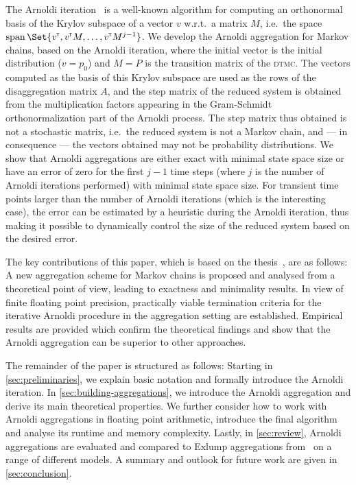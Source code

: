 \documentclass[runningheads]{llncs}
\newcommand*{\abbrev}[1]{\textsc{#1}}
\newcommand*{\transp}{^{\mkern-1.5mu{\scriptscriptstyle\mathsf{T}}}}
\DeclareMathOperator{\spn}{span}
\begin{document}
The Arnoldi iteration~\cite{arnoldi1951iteration} is a well-known algorithm for computing an orthonormal basis of the Krylov subspace of a vector $v$ w.r.t.\ a matrix $M$, i.e.\ the space $\spn\Set{v\transp, v\transp M, \dots, v\transp M^{j - 1}}$.
We develop the Arnoldi aggregation for Markov chains, based on the Arnoldi iteration, where the initial vector is the initial distribution ($v=p_0$) and $M=P$ is the transition matrix of the \abbrev{dtmc}.
The vectors computed as the basis of this Krylov subspace are used as the rows of the disaggregation matrix $A$, and the step matrix of the reduced system is obtained from the multiplication factors appearing in the Gram-Schmidt orthonormalization part of the Arnoldi process.
The step matrix thus obtained is not a stochastic matrix, i.e.\ the reduced system is not a Markov chain, and --- in consequence --- the vectors obtained may not be probability distributions.
We show that Arnoldi aggregations are either exact with minimal state space size or have an error of zero for the first $j-1$ time steps (where $j$ is the number of Arnoldi iterations performed)  with minimal state space size.
For transient time points larger than the number of Arnoldi iterations (which is the interesting case), the error can be estimated by a heuristic during the Arnoldi iteration, thus making it possible to dynamically control the size of the reduced system based on the desired error.

The key contributions of this paper, which is based on the thesis~\cite{sonnentag2025thesis}, are as follows:
A new aggregation scheme for Markov chains is proposed and analysed from a theoretical point of view, leading to exactness and minimality results.
In view of finite floating point precision, practically viable termination criteria for the iterative Arnoldi procedure in the aggregation setting are established.
Empirical results are provided which confirm the theoretical findings and show that the Arnoldi aggregation can be superior to other approaches.

The remainder of the paper is structured as follows:
Starting in \cref{sec:preliminaries}, we explain basic notation and formally introduce the Arnoldi iteration.
In \cref{sec:building-aggregations}, we introduce the Arnoldi aggregation and derive its main theoretical properties.
We further consider how to work with Arnoldi aggregations in floating point arithmetic, introduce the final algorithm and analyse its runtime and memory complexity.
Lastly, in \cref{sec:review}, Arnoldi aggregations are evaluated and compared to Exlump aggregations from~\cite[Algorithm~3]{michel2025formalbounds} on a range of different models.
A summary and outlook for future work are given in \cref{sec:conclusion}.
\end{document}
